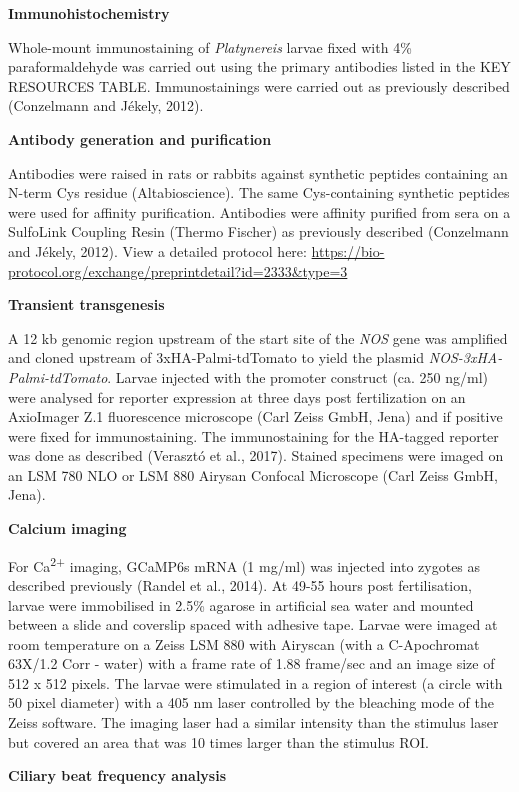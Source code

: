 \documentclass[
  10pt,
  onecolumn]{article}
\begin{document}
\textbf{Immunohistochemistry}

Whole-mount immunostaining of \emph{Platynereis} larvae fixed with 4\%
paraformaldehyde was carried out using the primary antibodies listed in
the KEY RESOURCES TABLE. Immunostainings were carried out as previously
described (Conzelmann and Jékely, 2012).

\textbf{Antibody generation and purification}

Antibodies were raised in rats or rabbits against synthetic peptides
containing an N-term Cys residue (Altabioscience). The same
Cys-containing synthetic peptides were used for affinity purification.
Antibodies were affinity purified from sera on a SulfoLink Coupling
Resin (Thermo Fischer) as previously described (Conzelmann and Jékely,
2012). View a detailed protocol here:
\url{https://bio-protocol.org/exchange/preprintdetail?id=2333\&type=3}

\textbf{Transient transgenesis}

A 12 kb genomic region upstream of the start site of the \emph{NOS} gene
was amplified and cloned upstream of 3xHA-Palmi-tdTomato to yield the
plasmid \emph{NOS-3xHA-Palmi-tdTomato}. Larvae injected with the
promoter construct (ca. 250 ng/ml) were analysed for reporter expression
at three days post fertilization on an AxioImager Z.1 fluorescence
microscope (Carl Zeiss GmbH, Jena) and if positive were fixed for
immunostaining. The immunostaining for the HA-tagged reporter was done
as described (Verasztó et al., 2017). Stained specimens were imaged on
an LSM 780 NLO or LSM 880 Airysan Confocal Microscope (Carl Zeiss GmbH,
Jena).

\textbf{Calcium imaging}

For Ca\textsuperscript{2+} imaging, GCaMP6s mRNA (1 mg/ml) was injected
into zygotes as described previously (Randel et al., 2014). At 49-55
hours post fertilisation, larvae were immobilised in 2.5\% agarose in
artificial sea water and mounted between a slide and coverslip spaced
with adhesive tape. Larvae were imaged at room temperature on a Zeiss
LSM 880 with Airyscan (with a C-Apochromat 63X/1.2 Corr - water) with a
frame rate of 1.88 frame/sec and an image size of 512 x 512 pixels. The
larvae were stimulated in a region of interest (a circle with 50 pixel
diameter) with a 405 nm laser controlled by the bleaching mode of the
Zeiss software. The imaging laser had a similar intensity than the
stimulus laser but covered an area that was 10 times larger than the
stimulus ROI.

\textbf{Ciliary beat frequency analysis}
\end{document}
